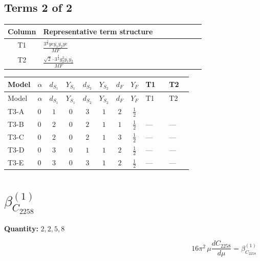 \documentclass[8pt]{article}
\begin{document}
\begin{landscape}
\subsection*{Terms 2 of 2}
\begin{center}
\begin{tabular}{@{}c >{\raggedright\arraybackslash}p{0.82\linewidth}@{}}
\toprule
Column & Representative term structure \\
\midrule
T1 & \(\displaystyle \frac{3^{\frac{3}{4}} ye \overline{y_{1}} \overline{y_{2}} \overline{ye}}{MF}\) \\
\midrule
T2 & \(\displaystyle \frac{\sqrt{2} \cdot 3^{\frac{3}{4}} g_{2}^{2} \overline{y_{1}} \overline{y_{2}}}{MF}\) \\
\midrule
\bottomrule
\end{tabular}
\end{center}
\smallskip
\tiny
\begin{longtable}{@{}llcccccc >{\raggedright\arraybackslash}p{0.21\linewidth} >{\raggedright\arraybackslash}p{0.21\linewidth}@{}}
\toprule
Model & $\alpha$ & $d_{S_1}$ & $Y_{S_1}$ & $d_{S_2}$ & $Y_{S_2}$ & $d_F$ & $Y_F$ & T1 & T2 \\
\midrule
\endfirsthead
\toprule
Model & $\alpha$ & $d_{S_1}$ & $Y_{S_1}$ & $d_{S_2}$ & $Y_{S_2}$ & $d_F$ & $Y_F$ & T1 & T2 \\
\midrule
\endhead
T3-A & $0$ & $1$ & $0$ & $3$ & $1$ & $2$ & $\frac{1}{2}$ & \scriptsize\adjustbox{max width=\linewidth}{$\begin{gathered} - \frac{3^{\frac{3}{4}} ye \overline{y_{1}} \overline{y_{2}} \overline{ye}}{12 MF}\end{gathered}$} & \scriptsize\adjustbox{max width=\linewidth}{$\begin{gathered} \frac{\sqrt{2} \cdot 3^{\frac{3}{4}} g_{2}^{2} \overline{y_{1}} \overline{y_{2}}}{3 MF}\end{gathered}$} \\
\midrule
T3-B & $0$ & $2$ & $0$ & $2$ & $1$ & $1$ & $\frac{1}{2}$ & --- & --- \\
\midrule
T3-C & $0$ & $2$ & $0$ & $2$ & $1$ & $3$ & $\frac{1}{2}$ & --- & --- \\
\midrule
T3-D & $0$ & $3$ & $0$ & $1$ & $1$ & $2$ & $\frac{1}{2}$ & --- & --- \\
\midrule
T3-E & $0$ & $3$ & $0$ & $3$ & $1$ & $2$ & $\frac{1}{2}$ & --- & --- \\
\midrule
\bottomrule
\end{longtable}
\clearpage
\section*{$\beta_{C_{2258}}^{(1)}$}
\noindent\textbf{Quantity: }$\mathrm{2,2,5,8}$\par\smallskip
\[16\pi^2\,\mu\frac{d C_{2258}}{d\mu}=\beta_{C_{2258}}^{(1)}\]

\end{landscape}
\end{document}
